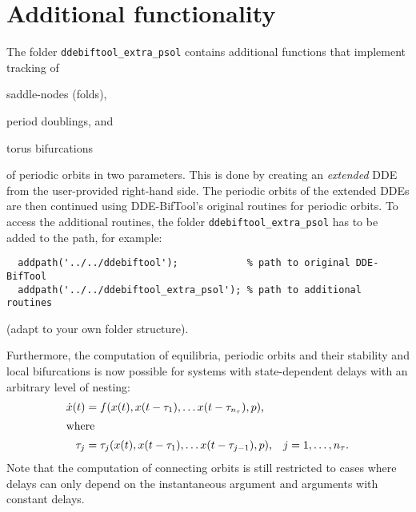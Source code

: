 \documentclass[11pt]{scrartcl}
\begin{document}

\section{Additional functionality}
\label{sec:extra}

The folder \texttt{ddebiftool\_extra\_psol} contains additional
functions that implement tracking of
\begin{compactitem}
\item saddle-nodes (folds),
\item period doublings, and
\item torus bifurcations
\end{compactitem}
of periodic orbits in two parameters. This is done by creating an
\emph{extended} DDE from the user-provided right-hand side. The
periodic orbits of the extended DDEs are then continued using
DDE-BifTool's original routines for periodic orbits.  To access the
additional routines, the folder \texttt{ddebiftool\_extra\_psol} has
to be added to the path, for example:
\begin{lstlisting}
  addpath('../../ddebiftool');            % path to original DDE-BifTool
  addpath('../../ddebiftool_extra_psol'); % path to additional routines
\end{lstlisting}
(adapt to your own folder structure).

Furthermore, the computation of equilibria, periodic orbits and their
stability and local bifurcations is now possible for systems with
state-dependent delays with an arbitrary level of nesting:
\begin{align*}
  \dot x(t)&=f(x(t),x(t-\tau_1),\ldots x(t-\tau_{n_\tau}),p)\mbox{,}\\
\intertext{where}
  \tau_j&=\tau_j(x(t),x(t-\tau_1),\ldots x(t-\tau_{j-1}),p)
  \mbox{,\quad $j=1,\ldots,n_\tau$.}
\end{align*}
Note that the computation of connecting orbits is still restricted to
cases where delays can only depend on the instantaneous argument and
arguments with constant delays.
\end{document}
